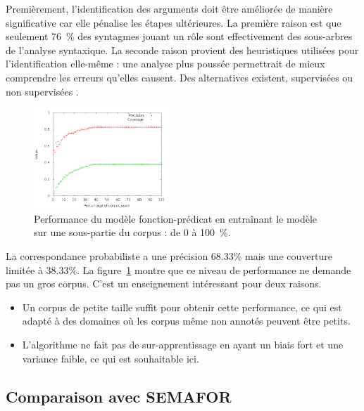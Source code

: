 Premièrement, l'identification des arguments doit être améliorée de manière
significative car elle pénalise les étapes ultérieures. La première raison est
que seulement 76~\% des syntagmes jouant un rôle sont effectivement des
sous-arbres de l'analyse syntaxique.
La seconde raison provient des heuristiques utilisées pour l'identification
elle-même : une analyse plus poussée permettrait de mieux comprendre les
erreurs qu'elles causent. Des alternatives existent, supervisées ou non
supervisées \citep{abend2009unsupervised}.

\begin{figure}[t]
    \centering
    \includegraphics[width=0.45\textwidth]{fig/slot-predicate-percents.png}
    \caption{\label{fig:fonction_predicate}Performance du modèle fonction-prédicat en entraînant le modèle sur une sous-partie du corpus : de 0 à 100~\%.}
\end{figure}

La correspondance probabiliste a une précision 68.33\% mais une couverture
limitée à 38.33\%. La figure~\ref{fig:fonction_predicate} montre que ce niveau
de performance ne demande pas un gros corpus. C'est un enseignement intéressant
pour deux raisons.

\begin{itemize}

    \item Un corpus de petite taille suffit pour obtenir cette performance, ce
    qui est adapté à des domaines où les corpus même non annotés peuvent être
    petits.

    \item L'algorithme ne fait pas de sur-apprentissage en ayant un biais fort
    et une variance faible, ce qui est souhaitable ici.

\end{itemize}

\subsection{Comparaison avec SEMAFOR}

